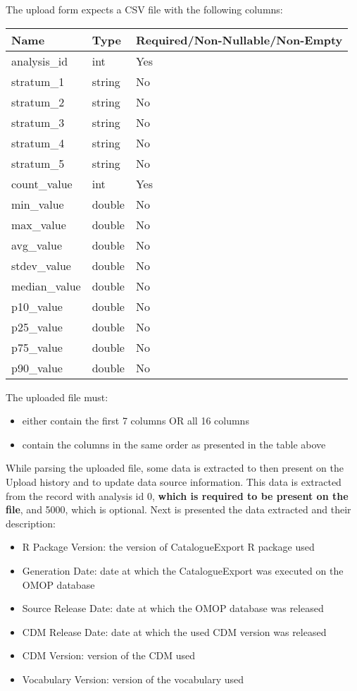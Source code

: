 \documentclass[
]{book}
\begin{document}
The upload form expects a CSV file with the following columns:

\begin{longtable}[]{@{}lll@{}}
\toprule
Name & Type & Required/Non-Nullable/Non-Empty\tabularnewline
\midrule
\endhead
analysis\_id & int & Yes\tabularnewline
stratum\_1 & string & No\tabularnewline
stratum\_2 & string & No\tabularnewline
stratum\_3 & string & No\tabularnewline
stratum\_4 & string & No\tabularnewline
stratum\_5 & string & No\tabularnewline
count\_value & int & Yes\tabularnewline
min\_value & double & No\tabularnewline
max\_value & double & No\tabularnewline
avg\_value & double & No\tabularnewline
stdev\_value & double & No\tabularnewline
median\_value & double & No\tabularnewline
p10\_value & double & No\tabularnewline
p25\_value & double & No\tabularnewline
p75\_value & double & No\tabularnewline
p90\_value & double & No\tabularnewline
\bottomrule
\end{longtable}

The uploaded file must:

\begin{itemize}
\item
  either contain the first 7 columns OR all 16 columns
\item
  contain the columns in the same order as presented in the table above
\end{itemize}

While parsing the uploaded file, some data is extracted to then present on the Upload history and to update data source information. This data is extracted from the record with analysis id 0, \textbf{which is required to be present on the file}, and 5000, which is optional. Next is presented the data extracted and their description:

\begin{itemize}
\item
  R Package Version: the version of CatalogueExport R package used
\item
  Generation Date: date at which the CatalogueExport was executed on the OMOP database
\item
  Source Release Date: date at which the OMOP database was released
\item
  CDM Release Date: date at which the used CDM version was released
\item
  CDM Version: version of the CDM used
\item
  Vocabulary Version: version of the vocabulary used
\end{itemize}
\end{document}
